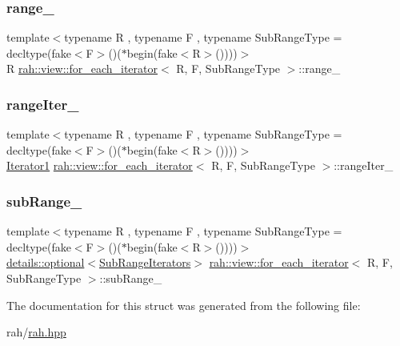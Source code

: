 \subsubsection{\texorpdfstring{range\_}{range\_}}
{\footnotesize\ttfamily template$<$typename R , typename F , typename Sub\+Range\+Type  = decltype(fake$<$\+F$>$()($\ast$begin(fake$<$\+R$>$())))$>$ \\
R \mbox{\hyperlink{structrah_1_1view_1_1for__each__iterator}{rah\+::view\+::for\+\_\+each\+\_\+iterator}}$<$ R, F, Sub\+Range\+Type $>$\+::range\+\_\+}

\mbox{\label{structrah_1_1view_1_1for__each__iterator_a23d837fe1aca0aa4ef3e3c7683b00aec}} 
\subsubsection{\texorpdfstring{rangeIter\_}{rangeIter\_}}
{\footnotesize\ttfamily template$<$typename R , typename F , typename Sub\+Range\+Type  = decltype(fake$<$\+F$>$()($\ast$begin(fake$<$\+R$>$())))$>$ \\
\mbox{\hyperlink{structrah_1_1view_1_1for__each__iterator_a173ab775f95bdff3b3756714690be546}{Iterator1}} \mbox{\hyperlink{structrah_1_1view_1_1for__each__iterator}{rah\+::view\+::for\+\_\+each\+\_\+iterator}}$<$ R, F, Sub\+Range\+Type $>$\+::range\+Iter\+\_\+}

\mbox{\label{structrah_1_1view_1_1for__each__iterator_a51f880dad745bc5fc0f5de78353ceb90}} 
\subsubsection{\texorpdfstring{subRange\_}{subRange\_}}
{\footnotesize\ttfamily template$<$typename R , typename F , typename Sub\+Range\+Type  = decltype(fake$<$\+F$>$()($\ast$begin(fake$<$\+R$>$())))$>$ \\
\mbox{\hyperlink{structrah_1_1view_1_1details_1_1optional}{details\+::optional}}$<$\mbox{\hyperlink{structrah_1_1view_1_1for__each__iterator_1_1_sub_range_iterators}{Sub\+Range\+Iterators}}$>$ \mbox{\hyperlink{structrah_1_1view_1_1for__each__iterator}{rah\+::view\+::for\+\_\+each\+\_\+iterator}}$<$ R, F, Sub\+Range\+Type $>$\+::sub\+Range\+\_\+}



The documentation for this struct was generated from the following file\+:\begin{DoxyCompactItemize}
\item 
rah/\mbox{\hyperlink{rah_8hpp}{rah.\+hpp}}\end{DoxyCompactItemize}

